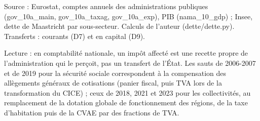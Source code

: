 Source : Eurostat, comptes annuels des administrations publiques (gov\_10a\_main, gov\_10a\_taxag, gov\_10a\_exp), PIB (nama\_10\_gdp) ; Insee, dette de Maastricht par sous-secteur. Calculs de l'auteur (dette/dette.py). Transferts : courants (D7) et en capital (D9).\par Lecture : en comptabilité nationale, un impôt affecté est une recette propre de l'administration qui le perçoit, pas un transfert de l'État. Les sauts de 2006-2007 et de 2019 pour la sécurité sociale correspondent à la compensation des allègements généraux de cotisations (panier fiscal, puis TVA lors de la transformation du CICE) ; ceux de 2018, 2021 et 2023 pour les collectivités, au remplacement de la dotation globale de fonctionnement des régions, de la taxe d'habitation puis de la CVAE par des fractions de TVA.
